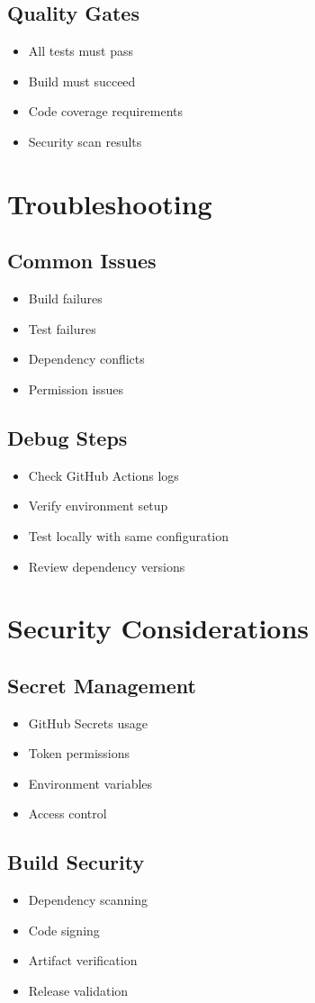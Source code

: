 \documentclass{article}
\begin{document}
\subsection{Quality Gates}
\begin{itemize}
    \item All tests must pass
    \item Build must succeed
    \item Code coverage requirements
    \item Security scan results
\end{itemize}

\section{Troubleshooting}

\subsection{Common Issues}
\begin{itemize}
    \item Build failures
    \item Test failures
    \item Dependency conflicts
    \item Permission issues
\end{itemize}

\subsection{Debug Steps}
\begin{itemize}
    \item Check GitHub Actions logs
    \item Verify environment setup
    \item Test locally with same configuration
    \item Review dependency versions
\end{itemize}

\section{Security Considerations}

\subsection{Secret Management}
\begin{itemize}
    \item GitHub Secrets usage
    \item Token permissions
    \item Environment variables
    \item Access control
\end{itemize}

\subsection{Build Security}
\begin{itemize}
    \item Dependency scanning
    \item Code signing
    \item Artifact verification
    \item Release validation
\end{itemize}
\end{document}
